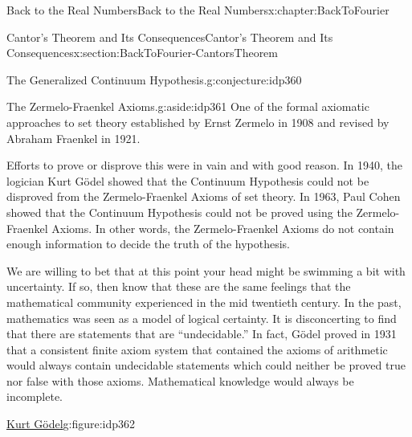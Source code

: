 \begin{chapterptx}{Back to the Real Numbers}{}{Back to the Real Numbers}{}{}{x:chapter:BackToFourier}
\begin{sectionptx}{Cantor's Theorem and Its Consequences}{}{Cantor's Theorem and Its Consequences}{}{}{x:section:BackToFourier-CantorsTheorem}
\begin{conjecture}{The Generalized Continuum Hypothesis.}{}{g:conjecture:idp360}
		\end{conjecture}
		\begin{aside}{The Zermelo-Fraenkel Axioms.}{g:aside:idp361}%
			One of the formal axiomatic approaches to set theory established by Ernst Zermelo in 1908 and revised by Abraham Fraenkel in 1921.%
		\end{aside}
		Efforts to prove or disprove this were in vain and with good reason.  In 1940, the logician Kurt Gödel showed that the Continuum Hypothesis could not be disproved from the Zermelo-Fraenkel Axioms of set theory.  In 1963, Paul Cohen showed that the Continuum Hypothesis could not be proved using the Zermelo-Fraenkel Axioms.  In other words, the Zermelo-Fraenkel Axioms do not contain enough information to decide the truth of the hypothesis.%
		\par
		We are willing to bet that at this point your head might be swimming a bit with uncertainty. If so, then know that these are the same feelings that the mathematical community experienced in the mid twentieth century. In the past, mathematics was seen as a model of logical certainty. It is disconcerting to find that there are statements that are ``undecidable.'' In fact, Gödel proved in 1931 that a consistent finite axiom system that contained the axioms of arithmetic would always contain undecidable statements which could neither be proved true nor false with those axioms. Mathematical knowledge would always be incomplete.%
		\begin{figureptx}{\href{https://mathshistory.st-andrews.ac.uk/Biographies/Godel/}{Kurt Gödel}\protect\footnotemark{}}{g:figure:idp362}{}%
			\begin{image}{0.325}{0.35}{0.325}%

\end{image}
\end{figureptx}
\end{sectionptx}
\end{chapterptx}
